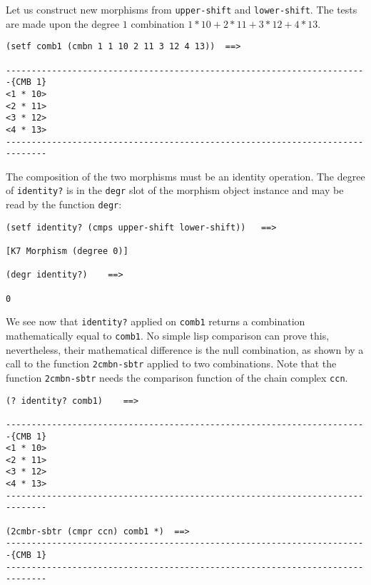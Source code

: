 Let us construct new morphisms from {\tt upper-shift} and {\tt lower-shift}.
The tests are made upon the  degree $1$ combination $1*10 + 2*11 + 3*12 +4*13$.
{\footnotesize\begin{verbatim}
(setf comb1 (cmbn 1 1 10 2 11 3 12 4 13))  ==>

-----------------------------------------------------------------------{CMB 1}
<1 * 10>
<2 * 11>
<3 * 12>
<4 * 13>
------------------------------------------------------------------------------
\end{verbatim}}
The composition of the two morphisms  must be an identity operation.
The degree of {\tt identity?} is in the {\tt degr}  slot of the morphism object instance and may be read
by the function {\tt degr}:
{\footnotesize\begin{verbatim}
(setf identity? (cmps upper-shift lower-shift))   ==>

[K7 Morphism (degree 0)]

(degr identity?)    ==>

0
\end{verbatim}}
We see now that {\tt identity?} applied on {\tt comb1} returns a combination
ma\-the\-ma\-ti\-cal\-ly equal to {\tt comb1}. No simple lisp comparison can prove this,
nevertheless, their mathematical difference is the null combination, as shown by a
call to the function {\tt 2cmbn-sbtr} applied to two combinations. Note that the
function {\tt 2cmbn-sbtr} needs the comparison function of the chain complex {\tt ccn}.
{\footnotesize\begin{verbatim}
(? identity? comb1)    ==>

-----------------------------------------------------------------------{CMB 1}
<1 * 10>
<2 * 11>
<3 * 12>
<4 * 13>
------------------------------------------------------------------------------

(2cmbr-sbtr (cmpr ccn) comb1 *)  ==>
-----------------------------------------------------------------------{CMB 1}
------------------------------------------------------------------------------
\end{verbatim}}

